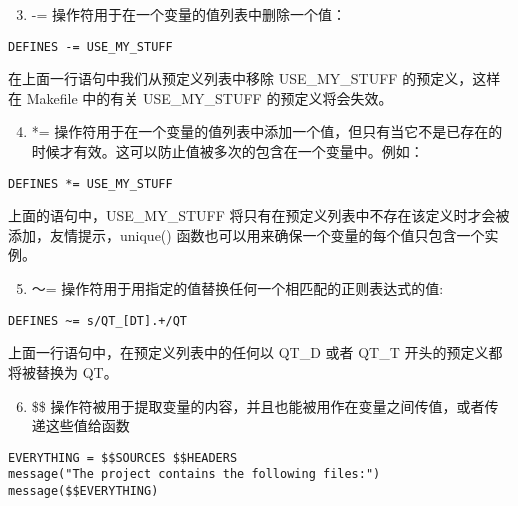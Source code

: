 \begin{enumerate}
\setcounter{enumi}{2}

\item
  -= 操作符用于在一个变量的值列表中删除一个值：
\end{enumerate}

\begin{verbatim}
DEFINES -= USE_MY_STUFF
\end{verbatim}

在上面一行语句中我们从预定义列表中移除 USE\_MY\_STUFF 的预定义，这样在
Makefile 中的有关 USE\_MY\_STUFF 的预定义将会失效。

\begin{enumerate}
\setcounter{enumi}{3}

\item
  *=
  操作符用于在一个变量的值列表中添加一个值，但只有当它不是已存在的时候才有效。这可以防止值被多次的包含在一个变量中。例如：
\end{enumerate}

\begin{verbatim}
DEFINES *= USE_MY_STUFF
\end{verbatim}

上面的语句中，USE\_MY\_STUFF
将只有在预定义列表中不存在该定义时才会被添加，友情提示，unique()
函数也可以用来确保一个变量的每个值只包含一个实例。

\begin{enumerate}
\setcounter{enumi}{4}

\item
  ～= 操作符用于用指定的值替换任何一个相匹配的正则表达式的值:
\end{enumerate}

\begin{verbatim}
DEFINES ~= s/QT_[DT].+/QT
\end{verbatim}

上面一行语句中，在预定义列表中的任何以 QT\_D 或者 QT\_T
开头的预定义都将被替换为 QT。

\begin{enumerate}
\setcounter{enumi}{5}

\item
  \$\$
  操作符被用于提取变量的内容，并且也能被用作在变量之间传值，或者传递这些值给函数
\end{enumerate}

\begin{verbatim}
EVERYTHING = $$SOURCES $$HEADERS
message("The project contains the following files:")
message($$EVERYTHING)
\end{verbatim}

